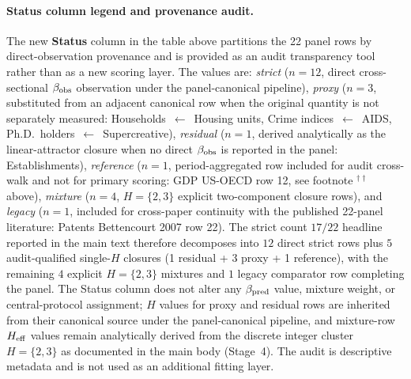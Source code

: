 \paragraph{Status column legend and provenance audit.}
The new \textbf{Status} column in the table above partitions the 22 panel rows by direct-observation provenance and is provided as an audit transparency tool rather than as a new scoring layer. The values are: \textit{strict} ($n=12$, direct cross-sectional $\beta_{\rm obs}$ observation under the panel-canonical pipeline), \textit{proxy} ($n=3$, substituted from an adjacent canonical row when the original quantity is not separately measured: Households~$\leftarrow$~Housing units, Crime indices~$\leftarrow$~AIDS, Ph.D.~holders~$\leftarrow$~Supercreative), \textit{residual} ($n=1$, derived analytically as the linear-attractor closure when no direct $\beta_{\rm obs}$ is reported in the panel: Establishments), \textit{reference} ($n=1$, period-aggregated row included for audit cross-walk and not for primary scoring: GDP US-OECD row 12, see footnote $^{\dagger\dagger}$ above), \textit{mixture} ($n=4$, $H{=}\{2,3\}$ explicit two-component closure rows), and \textit{legacy} ($n=1$, included for cross-paper continuity with the published 22-panel literature: Patents Bettencourt 2007 row 22). The strict count $17/22$ headline reported in the main text therefore decomposes into $12$ direct strict rows plus $5$ audit-qualified single-$H$ closures (1 residual + 3 proxy + 1 reference), with the remaining $4$ explicit $H{=}\{2,3\}$ mixtures and $1$ legacy comparator row completing the panel. The Status column does not alter any $\beta_{\rm pred}$ value, mixture weight, or central-protocol assignment; $H$ values for proxy and residual rows are inherited from their canonical source under the panel-canonical pipeline, and mixture-row $H_{\rm eff}$ values remain analytically derived from the discrete integer cluster $H{=}\{2,3\}$ as documented in the main body (Stage~4). The audit is descriptive metadata and is not used as an additional fitting layer.

